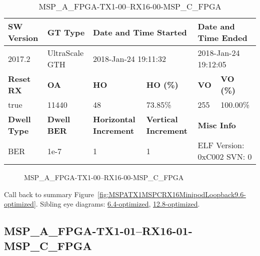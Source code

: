 \begin{table}[h]
\centering
\caption{MSP\_A\_FPGA-TX1-00--RX16-00-MSP\_C\_FPGA}
\label{tab:MSPAFPGATX100RX1600MSPCFPGA9.6-optimized}
\begin{tabular}{@{}|l|l|l|l|l|l|@{}}
\toprule
\textbf{SW Version}                & \textbf{GT Type}   & \multicolumn{2}{l|}{\textbf{Date and Time Started}}            & \multicolumn{2}{l|}{\textbf{Date and Time Ended}}        \\ \midrule
2017.2                       & UltraScale GTH          & \multicolumn{2}{l|}{2018-Jan-24 19:11:32}                   & \multicolumn{2}{l|}{2018-Jan-24 19:12:05}               \\ \midrule
\textbf{Reset RX}                  & \textbf{OA} & \textbf{HO}   & \textbf{HO (\%)} & \textbf{VO} & \textbf{VO (\%)} \\ \midrule
true & 11440        & 48          & 73.85\%        & 255        & 100.00\%       \\ \midrule
\textbf{Dwell Type}                & \textbf{Dwell BER} & \textbf{Horizontal Increment} & \textbf{Vertical Increment}    & \multicolumn{2}{l|}{\textbf{Misc Info}}                  \\ \midrule
BER                            & 1e-7        & 1        & 1           & \multicolumn{2}{l|}{ELF Version: 0xC002 SVN: 0}                         \\ \bottomrule
\end{tabular}
\end{table}

\begin{figure}[h]
\caption{MSP\_A\_FPGA-TX1-00--RX16-00-MSP\_C\_FPGA} \label{fig:MSPAFPGATX100RX1600MSPCFPGA9.6-optimized}
\end{figure}

Call back to summary Figure~\ref{fig:MSPATX1MSPCRX16MinipodLoopback9.6-optimized}.
Sibling eye diagrams: \hyperref[sec:MSPAFPGATX100RX1600MSPCFPGA6.4-optimized]{6.4-optimized}, \hyperref[sec:MSPAFPGATX100RX1600MSPCFPGA12.8-optimized]{12.8-optimized}.

\clearpage
\newpage


\subsection{MSP\_A\_FPGA-TX1-01--RX16-01-MSP\_C\_FPGA}\label{sec:MSPAFPGATX101RX1601MSPCFPGA9.6-optimized}

